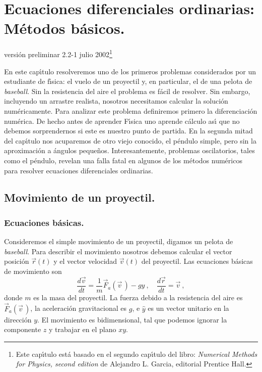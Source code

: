 \chapter[EDO: M{\'e}todos b{\'a}sicos.]{Ecuaciones diferenciales ordinarias: M{\'e}todos b{\'a}sicos.}

\vspace{-1cm}
\hfill {\tiny versi{\'o}n preliminar 2.2-1 julio 2002\footnote{Este cap{\'\i}tulo est{\'a} basado en
    el segundo cap{\'\i}tulo del libro: {\em Numerical Methods for Physics,
      second edition} de Alejandro L. Garcia, editorial {\sc Prentice Hall}.} }

En este cap{\'\i}tulo resolveremos uno de los primeros problemas
considerados por un estudiante de f{\'\i}sica: el vuelo de un proyectil y,
en particular, el de una pelota de {\em baseball}. Sin la resistencia
del aire el problema es f{\'a}cil de resolver. Sin embargo, incluyendo un
arrastre realista, nosotros necesitamos calcular la soluci{\'o}n
num{\'e}ricamente. Para analizar este problema definiremos primero la
diferenciaci{\'o}n num{\'e}rica. De hecho antes de aprender F{\'\i}sica uno aprende
c{\'a}lculo as{\'\i} que no debemos sorprendernos si este es nuestro punto de
partida. En la segunda mitad del cap{\'\i}tulo nos acuparemos de otro viejo
conocido, el p{\'e}ndulo simple, pero sin la aproximaci{\'o}n a {\'a}ngulos
peque{\~n}os. Interesantemente, problemas oscilatorios, tales como el
p{\'e}ndulo, revelan una falla fatal en algunos de los m{\'e}todos num{\'e}ricos
para resolver ecuaciones diferenciales ordinarias.


\section{Movimiento de un proyectil.}
\label{c10-s1}

\subsection{Ecuaciones b{\'a}sicas.}

Consideremos el simple movimiento de un proyectil, digamos un pelota
de {\em baseball}. Para describir el movimiento nosotros debemos
calcular el vector posici{\'o}n $\vec r(t)$ y el vector velocidad
$\vec v(t)$ del proyectil. Las ecuaciones b{\'a}sicas de movimiento son
\begin{equation}
\label{c10-e2.1}
\frac{d\vec v}{dt}= \frac{1}{m} \vec F_a(\vec v\,) - g\hat y\ , \quad
\frac{d\vec r}{dt}= \vec v\ ,
\end{equation}
donde $m$ es la masa del proyectil. La fuerza debido a la resistencia
del aire es $\vec F_a(\vec v\,)$, la aceleraci{\'o}n gravitacional es $g$, e
$\hat y$ es un vector unitario en la direcci{\'o}n $y$. El movimiento es
bidimensional, tal que podemos ignorar la componente $z$ y trabajar en
el plano $xy$.

